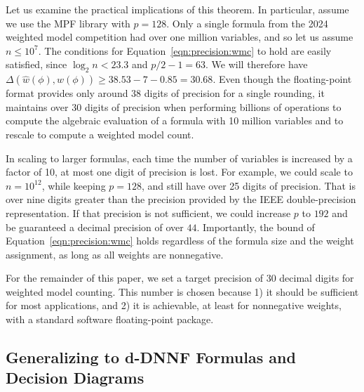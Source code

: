 \documentclass[letterpaper,USenglish,cleveref, autoref, thm-restate]{lipics-v2021}
\newcommand{\approximate}[1]{\hat{#1}}
\newcommand{\approxw}{\approximate{w}}
\newcommand{\digitprecision}{\Delta}
\begin{document}
Let us examine the practical implications of this theorem.  In
particular, assume we use the MPF library with $p=128$.  Only a single
formula from the 2024 weighted model competition had over one million
variables, and so let us assume  $n \leq 10^7$.  The
conditions for Equation~\ref{eqn:precision:wmc} to hold are easily
satisfied, since $\log_2 n < 23.3$ and $p/2-1 = 63$.  We will
therefore have
$\digitprecision(\approxw(\phi), w(\phi)) \geq 38.53 - 7 - 0.85 = 30.68$.
Even though the floating-point format
provides only around 38 digits of precision for a single rounding,
it maintains over 30 digits of precision when performing billions of operations to
compute the algebraic evaluation of a formula with 10
million variables and to rescale to compute a weighted model count.

In scaling to larger formulas, each time
the number of variables is increased by a factor of 10, at most one
digit of precision is lost.  For example, we could scale to $n=10^{12}$, while keeping $p=128$, and still have over 25 digits of precision.  That is over nine digits greater than the precision
provided by the IEEE double-precision representation.  If that precision is not sufficient, we could increase $p$ to $192$ and be guaranteed a decimal precision of over $44$.
Importantly, the bound of Equation~\ref{eqn:precision:wmc} holds regardless of the formula size and the weight assignment, 
as long as all weights are nonnegative.

For the remainder of this paper, we set a target precision of 30 decimal digits for
weighted model counting.  This number is chosen because 1) it should be
sufficient for most applications, and 2) it
is achievable, at least for nonnegative weights, with a standard software floating-point package.

\subsection{Generalizing to d-DNNF Formulas and Decision Diagrams}
\label{sect:ddnnf}
\end{document}
